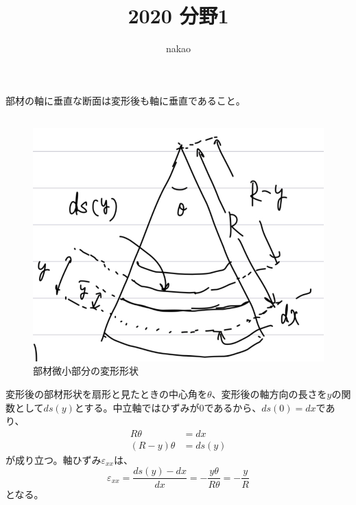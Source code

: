 \documentclass[a4paper]{jsarticle}
\begin{document}
\title{2020 分野1}
\author{nakao}
\maketitle

\section{}
\subsection{}
部材の軸に垂直な断面は変形後も軸に垂直であること。

\subsection{}
\begin{figure}[htb]
  \centering
  \includegraphics[width=0.3\hsize]{fig1.png}
  \caption{部材微小部分の変形形状}
\end{figure}
変形後の部材形状を扇形と見たときの中心角を$\theta$、変形後の軸方向の長さを$y$の関数として$ds(y)$とする。中立軸ではひずみが0であるから、$ds(0)=dx$であり、
\begin{equation}
  \begin{aligned}
    R \theta &= dx \\
    (R - y) \theta &= ds(y)
  \end{aligned}
\end{equation}
が成り立つ。軸ひずみ$\varepsilon_{xx}$は、
\begin{equation}
  \varepsilon_{xx} = \frac{ds(y) - dx}{dx} = -\frac{y \theta}{R \theta} = -\frac{y}{R}
\end{equation}
となる。
\end{document}
